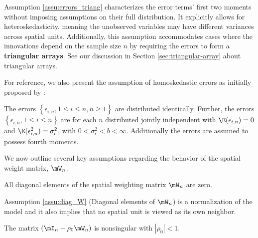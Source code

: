 \documentclass[english,12pt]{book}\usepackage[]{graphicx}\usepackage[]{xcolor}
\begin{document}
Assumption \ref{assu:errors_triang} characterizes the error terms' first two moments without imposing assumptions on their full distribution. It explicitly allows for heteroskedasticity, meaning the unobserved variables may have different variances across spatial units. Additionally, this assumption accommodates cases where the innovations depend on the sample size $n$ by requiring the errors to form a \textbf{triangular arrays}. See our discussion in Section \ref{sec:triangular-array} about triangular arrays. 

For reference, we also present the assumption of homoskedastic errors as initially proposed by \cite{kelejian1998generalized}:

\begin{assumption}\label{assu:errors_homoskedastic}
The errors  $\left\lbrace \epsilon_{i,n}, 1 \leq i \leq n, n\geq 1\right\rbrace$ are distributed identically. Further, the errors $\left\lbrace \epsilon_{i,n}, 1 \leq i \leq n\right\rbrace$ are for each $n$ distributed jointly independent with  $\E(\epsilon_{i,n})= 0$ and $\E(\epsilon_{i,n}^2) = \sigma^2_{\epsilon}$, with $0 < \sigma^2_{\epsilon}  < b <\infty$. Additionally the errors are assumed to possess fourth moments.
\end{assumption}

We now outline several key assumptions regarding the behavior of the spatial weight matrix, $\mW_n$.

\begin{assumption}\label{assu:diag_W}
All diagonal elements of the spatial weighting matrix $\mW_n$ are zero.
\end{assumption}

Assumption \ref{assu:diag_W} (Diagonal elements of $\mW_n$) is a normalization of the model and it also implies that no spatial unit is viewed as its own neighbor. 

\begin{assumption}\label{assu:non_singularity}
The matrix $(\mI_n - \rho_0\mW_n)$ is nonsingular with $\left|\rho_0 \right|<1$.
\end{assumption}
\end{document}
